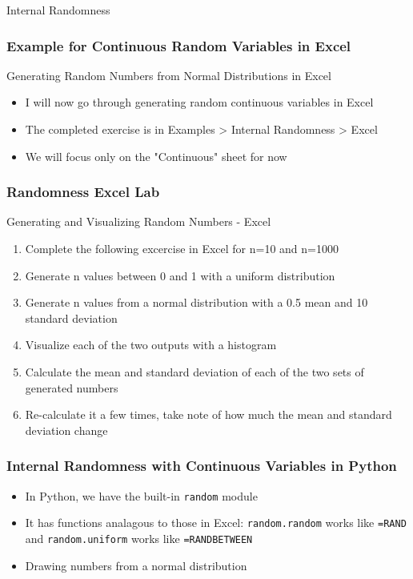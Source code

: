 \documentclass[handout, 11pt]{beamer}
\begin{document}
\begin{section}{Internal Randomness}
\begin{frame}
\end{frame}
\begin{frame}
\frametitle{Example for Continuous Random Variables in Excel}
{
\begin{block}{Generating Random Numbers from Normal Distributions in Excel}
\begin{itemize}
\item I will now go through generating random continuous variables in Excel
\item The completed exercise is in Examples > Internal Randomness > Excel 
\item We will focus only on the "Continuous" sheet for now
\end{itemize}
\end{block}
}
\end{frame}
\begin{frame}
\frametitle{Randomness Excel Lab}
{
\begin{block}{Generating and Visualizing Random Numbers - Excel}
\begin{enumerate}
\item Complete the following excercise in Excel for n=10 and n=1000
\item Generate n values between 0 and 1 with a uniform distribution
\item Generate n values from a normal distribution with a 0.5 mean and 10 standard deviation
\item Visualize each of the two outputs with a histogram
\item Calculate the mean and standard deviation of each of the two sets of generated numbers
\item Re-calculate it a few times, take note of how much the mean and standard deviation change
\end{enumerate}
\vfill
\end{block}
}
\label{labs:randomness-excel-lab-1}
\end{frame}
\begin{frame}
\frametitle{Internal Randomness with Continuous Variables in Python}
\begin{itemize}
\item In Python, we have the built-in
\texttt{random}
module
\vfill
\item It has functions analagous to those in Excel:
\texttt{random.random}
works like
\texttt{=RAND}
and
\texttt{random.uniform}
works like
\texttt{=RANDBETWEEN}
\vfill
\item Drawing numbers from a normal distribution

\end{itemize}
\end{frame}
\end{section}
\end{document}
